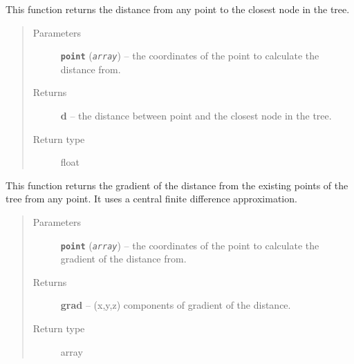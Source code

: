 \documentclass[letterpaper,10pt,english]{sphinxmanual}
\begin{document}
\begin{fulllineitems}
\begin{fulllineitems}
\label{Branch3D:Branch3D.Nodes.distance_from_point}
This function returns the distance from any point to the closest node in the tree.
\begin{quote}\begin{description}
\item[{Parameters}] \leavevmode
\textbf{\texttt{point}} (\emph{\texttt{array}}) -- the coordinates of the point to calculate the distance from.

\item[{Returns}] \leavevmode
\textbf{d} --
the distance between point and the closest node in the tree.

\item[{Return type}] \leavevmode
float

\end{description}\end{quote}

\end{fulllineitems}


\begin{fulllineitems}
\label{Branch3D:Branch3D.Nodes.gradient}
This function returns the gradient of the distance from the existing points of the tree from any point. It uses a central finite difference approximation.
\begin{quote}\begin{description}
\item[{Parameters}] \leavevmode
\textbf{\texttt{point}} (\emph{\texttt{array}}) -- the coordinates of the point to calculate the gradient of the distance from.

\item[{Returns}] \leavevmode
\textbf{grad} --
(x,y,z) components of gradient of the distance.

\item[{Return type}] \leavevmode
array

\end{description}\end{quote}

\end{fulllineitems}



\end{fulllineitems}
\end{document}
